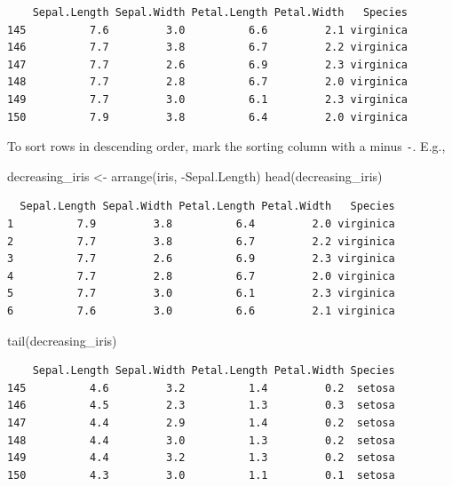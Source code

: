 \documentclass[
  letterpaper,
  DIV=11,
  numbers=noendperiod]{scrreprt}
\newenvironment{Shaded}{\begin{snugshade}}{\end{snugshade}}
\newcommand{\FunctionTok}[1]{\textcolor[rgb]{0.28,0.35,0.67}{#1}}
\newcommand{\NormalTok}[1]{\textcolor[rgb]{0.00,0.23,0.31}{#1}}
\newcommand{\OtherTok}[1]{\textcolor[rgb]{0.00,0.23,0.31}{#1}}
\newcommand{\SpecialCharTok}[1]{\textcolor[rgb]{0.37,0.37,0.37}{#1}}
\begin{document}
\begin{verbatim}
    Sepal.Length Sepal.Width Petal.Length Petal.Width   Species
145          7.6         3.0          6.6         2.1 virginica
146          7.7         3.8          6.7         2.2 virginica
147          7.7         2.6          6.9         2.3 virginica
148          7.7         2.8          6.7         2.0 virginica
149          7.7         3.0          6.1         2.3 virginica
150          7.9         3.8          6.4         2.0 virginica
\end{verbatim}

To sort rows in descending order, mark the sorting column with a minus
\texttt{-}. E.g.,

\begin{Shaded}
\begin{Highlighting}[]
\NormalTok{decreasing\_iris }\OtherTok{\textless{}{-}} \FunctionTok{arrange}\NormalTok{(iris, }\SpecialCharTok{{-}}\NormalTok{Sepal.Length)}
\FunctionTok{head}\NormalTok{(decreasing\_iris)}
\end{Highlighting}
\end{Shaded}

\begin{verbatim}
  Sepal.Length Sepal.Width Petal.Length Petal.Width   Species
1          7.9         3.8          6.4         2.0 virginica
2          7.7         3.8          6.7         2.2 virginica
3          7.7         2.6          6.9         2.3 virginica
4          7.7         2.8          6.7         2.0 virginica
5          7.7         3.0          6.1         2.3 virginica
6          7.6         3.0          6.6         2.1 virginica
\end{verbatim}

\begin{Shaded}
\begin{Highlighting}[]
\FunctionTok{tail}\NormalTok{(decreasing\_iris)}
\end{Highlighting}
\end{Shaded}

\begin{verbatim}
    Sepal.Length Sepal.Width Petal.Length Petal.Width Species
145          4.6         3.2          1.4         0.2  setosa
146          4.5         2.3          1.3         0.3  setosa
147          4.4         2.9          1.4         0.2  setosa
148          4.4         3.0          1.3         0.2  setosa
149          4.4         3.2          1.3         0.2  setosa
150          4.3         3.0          1.1         0.1  setosa
\end{verbatim}
\end{document}
